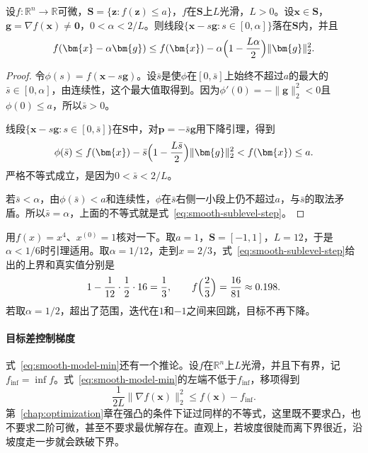 \begin{lemma}[梯度步留在下水平集内]
\label{lem:smooth-sublevel}
设$f:\mathbb{R}^n\to\mathbb{R}$可微，$\bm{S}=\{\bm{z}:f(\bm{z})\leq a\}$，$f$在$\bm{S}$上$L$光滑，$L>0$。设$\bm{x}\in\bm{S}$，$\bm{g}=\nabla f(\bm{x})\neq\bm{0}$，$0<\alpha<2/L$。则线段$\{\bm{x}-s\bm{g}:s\in[0,\alpha]\}$落在$\bm{S}$内，并且
\begin{equation}
 f(\bm{x}-\alpha\bm{g})\leq f(\bm{x})-\alpha\Bigl(1-\frac{L\alpha}{2}\Bigr)\lVert\bm{g}\rVert_2^2.
 \label{eq:smooth-sublevel-step}
\end{equation}
\end{lemma}

\begin{proof}
令$\phi(s)=f(\bm{x}-s\bm{g})$。设$\bar{s}$是使$\phi$在$[0,\bar{s}]$上始终不超过$a$的最大的$\bar{s}\in[0,\alpha]$，由连续性，这个最大值取得到。因为$\phi'(0)=-\lVert\bm{g}\rVert_2^2<0$且$\phi(0)\leq a$，所以$\bar{s}>0$。

线段$\{\bm{x}-s\bm{g}:s\in[0,\bar{s}]\}$在$\bm{S}$中，对$\bm{p}=-\bar{s}\bm{g}$用下降引理，得到
\[
 \phi(\bar{s})\leq f(\bm{x})-\bar{s}\Bigl(1-\frac{L\bar{s}}{2}\Bigr)\lVert\bm{g}\rVert_2^2<f(\bm{x})\leq a.
\]
严格不等式成立，是因为$0<\bar{s}<2/L$。

若$\bar{s}<\alpha$，由$\phi(\bar{s})<a$和连续性，$\phi$在$\bar{s}$右侧一小段上仍不超过$a$，与$\bar{s}$的取法矛盾。所以$\bar{s}=\alpha$，上面的不等式就是式~\eqref{eq:smooth-sublevel-step}。
\end{proof}

用$f(x)=x^4$、$x^{(0)}=1$核对一下。取$a=1$，$\bm{S}=[-1,1]$，$L=12$，于是$\alpha<1/6$时引理适用。取$\alpha=1/12$，走到$x=2/3$，式~\eqref{eq:smooth-sublevel-step}给出的上界和真实值分别是
\[
 1-\frac{1}{12}\cdot\frac12\cdot16=\frac13,\qquad f\Bigl(\frac23\Bigr)=\frac{16}{81}\approx0.198.
\]
若取$\alpha=1/2$，超出了范围，迭代在$1$和$-1$之间来回跳，目标不再下降。

\paragraph{目标差控制梯度}
式~\eqref{eq:smooth-model-min}还有一个推论。设$f$在$\mathbb{R}^n$上$L$光滑，并且下有界，记$f_{\inf}=\inf f$。式~\eqref{eq:smooth-model-min}的左端不低于$f_{\inf}$，移项得到
\begin{equation}
 \frac{1}{2L}\lVert\nabla f(\bm{x})\rVert_2^2\leq f(\bm{x})-f_{\inf}.
 \label{eq:smooth-gap-gradient}
\end{equation}
第~\ref{chap:optimization}章在强凸的条件下证过同样的不等式，这里既不要求凸，也不要求二阶可微，甚至不要求最优解存在。直观上，若坡度很陡而离下界很近，沿坡度走一步就会跌破下界。

